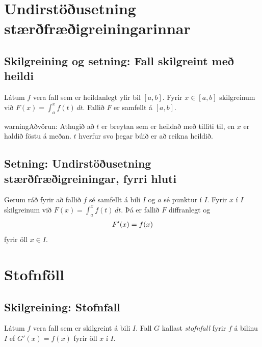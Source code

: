 \documentclass[b5paper,10pt,icelandic]{sphinxmanual}
\begin{document}
\section{Undirstöðusetning stærðfræðigreiningarinnar}
\label{kafli06:undirstousetning-staerfraeigreiningarinnar}

\subsection{Skilgreining og setning: Fall skilgreint með heildi}
\label{kafli06:skilgreining-og-setning-fall-skilgreint-me-heildi}\label{kafli06:index-5}
Látum \(f\) vera fall sem er heildanlegt yfir bil \([a, b]\).
Fyrir \(x\in[a, b]\) skilgreinum við \(F(x)=\int_a^x f(t)\,dt\).
Fallið \(F\) er samfellt á \([a, b]\).

\begin{notice}{warning}{Aðvörun:}
Athugið að \(t\) er breytan sem er heildað með tilliti til, en
\(x\) er haldið föstu á meðan. \(t\) hverfur svo þegar búið er
að reikna heildið.
\end{notice}


\subsection{Setning: Undirstöðusetning stærðfræðigreiningar, fyrri hluti}
\label{kafli06:setning-undirstousetning-staerfraeigreiningar-fyrri-hluti}\label{kafli06:undirstodusetning-fyrri}\label{kafli06:index-6}
Gerum ráð fyrir að fallið \(f\) sé samfellt á bili \(I\) og
\(a\) sé punktur í \(I\). Fyrir \(x\) í \(I\)
skilgreinum við \(F(x)=\int_a^x f(t)\,dt\). Þá er fallið \(F\)
diffranlegt og
\begin{gather}
\begin{split}F'(x)=f(x)\end{split}\notag
\end{gather}
fyrir öll \(x\in I\).


\section{Stofnföll}
\label{kafli06:stofnfoll}\label{kafli06:index-7}

\subsection{Skilgreining: Stofnfall}
\label{kafli06:skilgreining-stofnfall}
Látum \(f\) vera fall sem er skilgreint á bili \(I\). Fall
\(G\) kallast \textit{stofnfall} fyrir \(f\) á
bilinu \(I\) ef \(G'(x)=f(x)\) fyrir öll \(x\) í \(I\).
\end{document}

